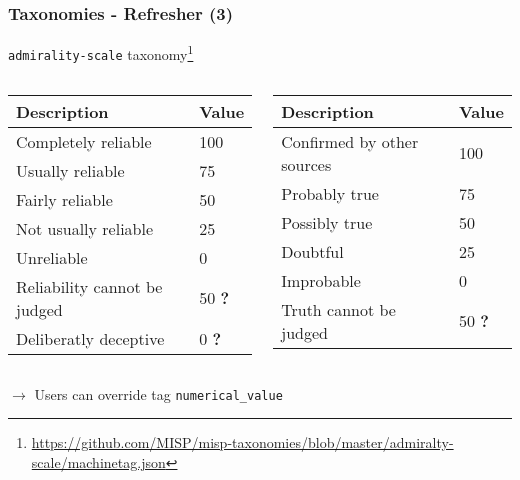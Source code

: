 \begin{frame}
    \frametitle{Taxonomies - Refresher (3)}
    \begin{footnotesize}
    \texttt{admirality-scale} taxonomy\footnote{\url{https://github.com/MISP/misp-taxonomies/blob/master/admiralty-scale/machinetag.json}}
    \begin{columns}[T] %
    \begin{column}{.40\textwidth}
        \begin{tabular}{|ll|}
            \hline
            \textbf{Description} & \textbf{Value}\\
            \hline
            Completely reliable & 100\\
            Usually reliable & 75\\
            Fairly reliable & 50\\
            Not usually reliable & 25\\
            Unreliable & 0\\
            Reliability cannot be judged & 50 \textbf{\color{red}?}\\
            Deliberatly deceptive & 0 \textbf{\color{red}?}\\
            \hline
        \end{tabular}
    \end{column}%
    \hfill%
    \begin{column}{.48\textwidth}
        \begin{tabular}{|ll|}
            \hline
            \textbf{Description} & \textbf{Value}\\
            \hline
            Confirmed by other sources & 100\\
            Probably true & 75\\
            Possibly true & 50\\
            Doubtful & 25\\
            Improbable & 0\\
            Truth cannot be judged & 50 \textbf{\color{red}?}\\
            \hline
        \end{tabular}
    \end{column}%
    \end{columns}
    \end{footnotesize}

    \vspace{0.5cm}
    $\rightarrow$ Users can override tag \texttt{numerical\_value}
\end{frame}

